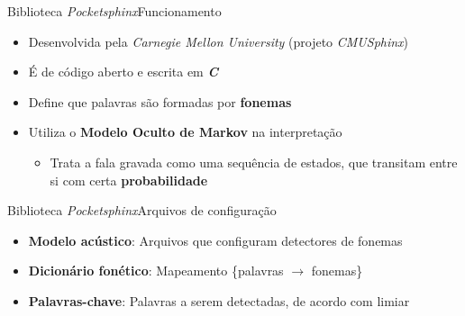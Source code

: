 \begin{frame}{Biblioteca \textit{Pocketsphinx}}{Funcionamento}

\begin{itemize}
\item Desenvolvida pela \textit{Carnegie Mellon University} (projeto \textit{CMUSphinx})

\item É de código aberto e escrita em \textbf{\textit{C}}

\item<2-> Define que palavras são formadas por \textbf{fonemas}

\item<3-> Utiliza o \textbf{Modelo Oculto de Markov} na interpretação

\begin{itemize}
  \item Trata a fala gravada como uma sequência de estados, que transitam entre si com certa \textbf{probabilidade}
\end{itemize}
\end{itemize}


\end{frame}


\begin{frame}{Biblioteca \textit{Pocketsphinx}}{Arquivos de configuração}

\begin{itemize}
\item \textbf{Modelo acústico}: Arquivos que configuram detectores de fonemas

\item<2-> \textbf{Dicionário fonético}: Mapeamento \{palavras \(\rightarrow\) fonemas\}
\end{itemize}


\begin{itemize}
\item<3-> \textbf{Palavras-chave}: Palavras a serem detectadas, de acordo com limiar
\end{itemize}

\end{frame}
